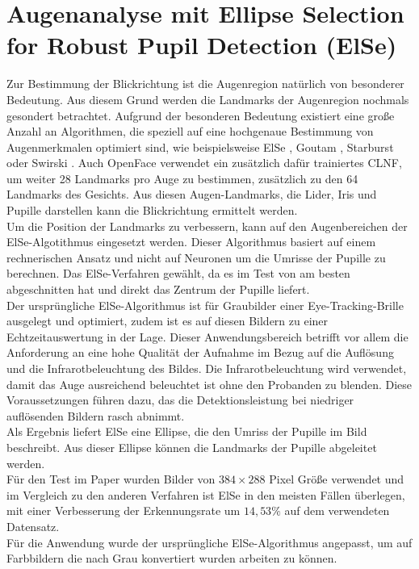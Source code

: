 \section{Augenanalyse mit Ellipse Selection for Robust Pupil Detection (ElSe)}
\label{ElSe}
Zur Bestimmung der Blickrichtung ist die Augenregion natürlich von besonderer Bedeutung. Aus diesem Grund werden die Landmarks der Augenregion nochmals gesondert betrachtet. Aufgrund der besonderen Bedeutung existiert eine große Anzahl an Algorithmen, die speziell auf eine hochgenaue Bestimmung von Augenmerkmalen optimiert sind, wie beispielsweise ElSe \cite{ElSe}, Goutam \cite{Eye_FastCorner}, Starburst \cite{Starburst} oder Swirski \cite{Swirski2012}. Auch OpenFace verwendet ein zusätzlich dafür trainiertes CLNF, um weiter 28 Landmarks pro Auge zu bestimmen, zusätzlich zu den 64 Landmarks des Gesichts. Aus diesen Augen-Landmarks, die Lider, Iris und Pupille darstellen kann die Blickrichtung ermittelt werden.\\
Um die Position der Landmarks zu verbessern, kann auf den Augenbereichen der ElSe-Algotithmus eingesetzt werden. Dieser Algorithmus basiert auf einem rechnerischen Ansatz und nicht auf Neuronen um die Umrisse der Pupille zu berechnen.
\newpage
Das ElSe-Verfahren gewählt, da es im Test von \cite{ElSe} am besten abgeschnitten hat und direkt das Zentrum der Pupille liefert.\\
Der ursprüngliche ElSe-Algorithmus ist für Graubilder einer Eye-Tracking-Brille ausgelegt und optimiert, zudem ist es auf diesen Bildern zu einer Echtzeitauswertung in der Lage. Dieser Anwendungsbereich betrifft vor allem die Anforderung an eine hohe Qualität der Aufnahme im Bezug auf die Auflösung und die Infrarotbeleuchtung des Bildes. Die Infrarotbeleuchtung wird verwendet, damit das Auge ausreichend beleuchtet ist ohne den Probanden zu blenden. Diese Voraussetzungen führen dazu, das die Detektionsleistung bei niedriger auflösenden Bildern rasch abnimmt.\\
Als Ergebnis liefert ElSe eine Ellipse, die den Umriss der Pupille im Bild beschreibt. Aus dieser Ellipse können die Landmarks der Pupille abgeleitet werden.\\
Für den Test im Paper wurden Bilder von $384\times 288$ Pixel Größe verwendet und im Vergleich zu den anderen Verfahren ist ElSe in den meisten Fällen überlegen, mit einer Verbesserung der Erkennungsrate um $14,53\%$ auf dem verwendeten Datensatz.\cite{ElSe}\\
Für die Anwendung wurde der ursprüngliche ElSe-Algorithmus angepasst, um auf Farbbildern die nach Grau konvertiert wurden arbeiten zu können.
